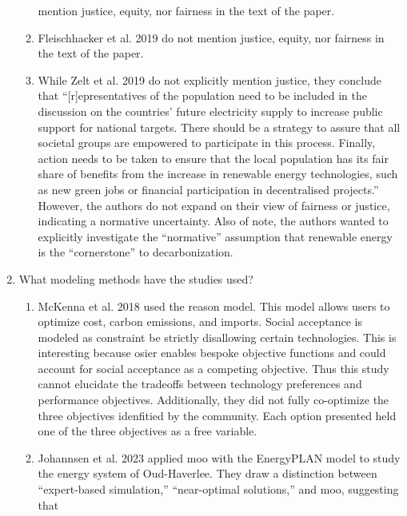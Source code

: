 \begin{enumerate}
\begin{enumerate}
        mention justice, equity, nor fairness in the text of the paper.
        \item Fleischhacker et al. 2019 \cite{fleischhacker_portfolio_2019} do
        not mention justice, equity, nor fairness in the text of the paper.
        \item While Zelt et al. 2019 \cite{zelt_long-term_2019} do not
        explicitly mention justice, they conclude that ``[r]epresentatives of the
        population need to be included in the discussion on the countries’
        future electricity supply to increase public support for national
        targets. There should be a strategy to assure that all societal groups
        are empowered to participate in this process. Finally, action needs to
        be taken to ensure that the local population has its fair share of
        benefits from the increase in renewable energy technologies, such as new
        green jobs or financial participation in decentralised projects.'' However,
        the authors do not expand on their view of fairness or justice, indicating
        a normative uncertainty. Also of note, the authors wanted to explicitly
        investigate the ``normative'' assumption that renewable energy is the
        ``cornerstone'' to decarbonization.
    \end{enumerate}
    \item What modeling methods have the studies used?
    \begin{enumerate}
        \item McKenna et al. 2018 \cite{mckenna_combining_2018} used the
        \ac{reason} model. This model allows users to optimize cost, carbon
        emissions, and imports. Social acceptance is modeled as constraint be
        strictly disallowing certain technologies. This is interesting because
        \ac{osier} enables bespoke objective functions and could account for
        social acceptance as a competing objective. Thus this study cannot
        elucidate the tradeoffs between technology preferences and performance
        objectives. Additionally, they did not fully co-optimize the three
        objectives idenfitied by the community. Each option presented held one
        of the three objectives as a free variable.
        \item Johannsen et al. 2023 \cite{johannsen_municipal_2023} applied
        \ac{moo} with the EnergyPLAN model to study the energy system of
        Oud-Haverlee. They draw a distinction between ``expert-based
        simulation,'' ``near-optimal solutions,'' and \ac{moo}, suggesting that

\end{enumerate}
\end{enumerate}
